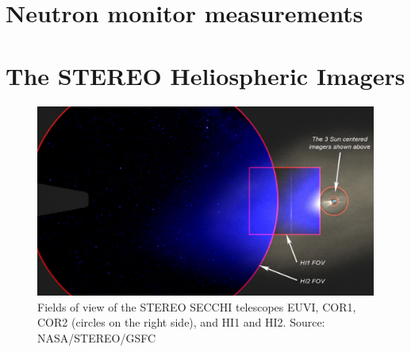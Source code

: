 \section{Neutron monitor measurements}
\label{sec:neutronmonitors}

\section{The STEREO Heliospheric Imagers}
\label{sec:stereohi}

\begin{figure}
    \centering
    \includegraphics[width=0.8\linewidth]{images/secchi_fov}
    \caption[Fields of view of the \acs{STEREO} SECCHI telescopes]{Fields of view of the \ac{STEREO} SECCHI telescopes EUVI, COR1, COR2 (circles on the right side), and HI1 and HI2. Source: NASA/STEREO/GSFC}
    \label{fig:secchifov}
\end{figure}
